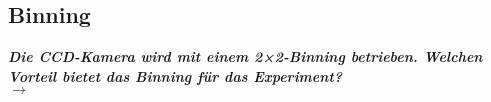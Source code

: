\subsection{\label{subsec:FZV10}Binning}
\textbf{\textit{Die CCD-Kamera wird mit einem 2×2-Binning betrieben. Welchen Vorteil bietet das Binning für das Experiment?}} \\
$\rightarrow$